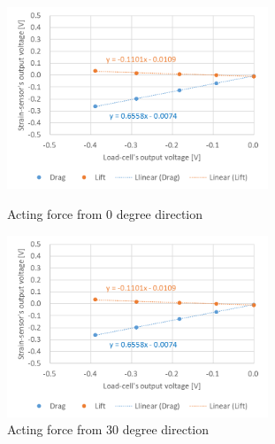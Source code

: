 \documentclass[twocolumn,a4j]{jsarticle}
\begin{document}
\begin{figure}[htbp]
    \footnotesize
    \begin{center}
        \includegraphics[width=78mm]{../images/0.png}
        \caption{Acting force from 0 degree direction}
        \includegraphics[width=78mm]{../images/30.png}
        \caption{Acting force from 30 degree direction}
    \end{center}
\end{figure}
\end{document}
